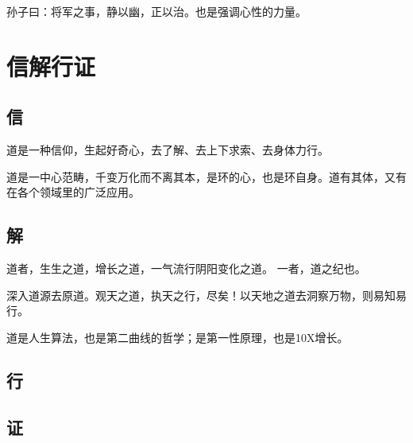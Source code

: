 孙子曰：将军之事，静以幽，正以治。也是强调心性的力量。

\section{信解行证}

\subsection{信}

道是一种信仰，生起好奇心，去了解、去上下求索、去身体力行。

道是一中心范畴，千变万化而不离其本，是环的心，也是环自身。道有其体，又有在各个领域里的广泛应用。

\subsection{解}

道者，生生之道，增长之道，一气流行阴阳变化之道。
一者，道之纪也。

深入道源去原道。观天之道，执天之行，尽矣！以天地之道去洞察万物，则易知易行。

道是人生算法，也是第二曲线的哲学；是第一性原理，也是10X增长。

\subsection{行}

\subsection{证}
